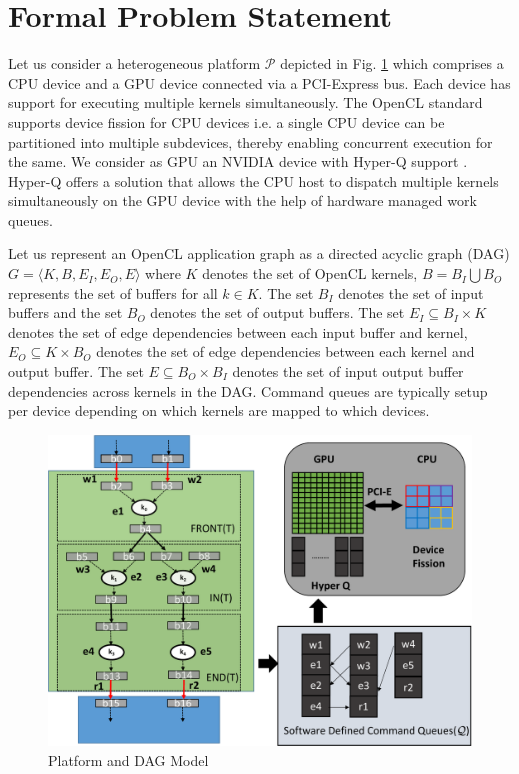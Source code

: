 \section{Formal Problem Statement}
\label{sec:prob}
	Let us consider a heterogeneous platform $\mathcal{P}$ depicted in Fig. \ref{fig:platprob} which comprises a CPU device and a GPU device connected via a PCI-Express bus. Each device has support for executing multiple kernels simultaneously. The OpenCL standard supports device fission for CPU devices i.e. a single CPU device can be partitioned into multiple subdevices, thereby enabling concurrent execution for the same. We consider as GPU an NVIDIA device with Hyper-Q support \cite{nvidia}. Hyper-Q offers a solution that allows the CPU host to dispatch multiple kernels simultaneously on the GPU device with the help of hardware managed work queues. 
	\par Let us represent an OpenCL application graph as a directed acyclic graph (DAG) $G = \langle K,B,E_I,E_O,E \rangle$ where $K$ denotes the set of OpenCL kernels, $B= B_I \bigcup B_O$ represents the set of buffers for all $k \in K$. The set $B_I$ denotes the set  of input buffers and the set $B_O$ denotes the set of output buffers. The set $E_I \subseteq B_I \times K$ denotes the set of edge dependencies between each input buffer and kernel, $E_O \subseteq K \times B_O$ denotes the set of edge dependencies between each kernel and output buffer. The set $E \subseteq B_O \times B_I$ denotes the set of input output buffer dependencies across kernels in the DAG. Command queues are typically setup per device depending on which kernels are mapped to which devices. 
	\begin{figure}[ht]
		\centering
		\includegraphics[scale=0.38]{Pictures/PlatformAndProblemFormulation.pdf}
		\caption{\small Platform and DAG Model\label{fig:platprob}}
	\end{figure}
	
